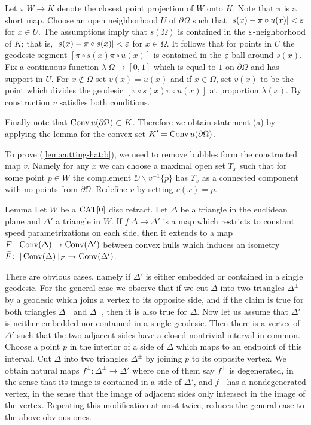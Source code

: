 \documentclass[a4paper,10pt]{amsart}
\begin{document}
Let $\pi\:W\to K$ denote the closest point projection of $W$ onto $K$. Note that $\pi$
is a short map. Choose an open neighborhood $U$ of $\partial \Omega$ such that 
$|s(x)-\pi\circ u(x)|<\varepsilon$ for $x\in U$. The assumptions imply that $s(\Omega)$ is 
contained in the $\varepsilon$-neighborhood of $K$;
that is, $|s(x)-\pi\circ s(x)|<\varepsilon$ for $x\in\Omega$.
It follows that for points in $U$ the geodesic segment $[\pi\circ s(x)\pi\circ u(x)]$ is contained in the $\varepsilon$-ball
around $s(x)$. Fix a continuous function $\lambda\:\Omega\to [0,1]$
which is equal to $1$ on $\partial \Omega$ and has support in $U$.
For $x\notin \Omega$ set $v(x)=u(x)$ and if 
$x\in \Omega$, set $v(x)$ to be the point which divides the geodesic $[\pi\circ s(x)\pi\circ u(x)]$
at proportion $\lambda(x)$. By construction $v$ satisfies both conditions.

Finally note that $\mathop{\rm Conv}\nolimits u(\partial\Omega)\subset K$. 
Therefore we obtain statement (a) 
by applying the lemma for the convex set $K'=\mathop{\rm Conv}\nolimits u(\partial\Omega)$.

To prove (\ref{lem:cutting-hat:b}), we need to remove bubbles form the constructed map $v$.
Namely for any $x$ we can choose a maximal open set $\Upsilon_x$ such that for some point $p\in W$ the complement $\DD\backslash v^{-1}\{p\}$ has $\Upsilon_x$ as a
connected component with no points from $\partial \DD$.
Redefine $v$ by setting $v(x)=p$.
\qeds

\begin{thm}{Lemma}\label{lem:isomtri}
Let $W$ be a $\mathop{\rm CAT}\nolimits[0]$ disc retract. 
Let $\Delta$ be a triangle in the euclidean plane
and $\Delta'$ a triangle in $W$. 
If $f\:\Delta\to \Delta'$ is a map which restricts to constant speed
parametrizations on each side, then it extends to a map 
$F\colon\mathop{\rm Conv}\nolimits(\Delta)\to \mathop{\rm Conv}\nolimits(\Delta')$ between convex hulls which induces an isometry $\bar F\colon\|\mathop{\rm Conv}\nolimits(\Delta)\|_F\to \mathop{\rm Conv}\nolimits(\Delta')$. 
\end{thm}

There are obvious cases, namely if $\Delta'$ is either embedded or contained in a single geodesic. 
For the general case we observe that if we cut $\Delta$ into two triangles $\Delta^\pm$ by a geodesic which joins a vertex to its opposite side, and if 
the claim is true for both triangles $\Delta^+$ and $\Delta^-$, then it is also true for $\Delta$. Now let us assume that $\Delta'$ is neither embedded nor contained
in a single geodesic. Then there is a vertex of $\Delta'$ such that the two adjacent sides have a closed nontrivial interval in common. Choose a point $p$ in the interior
of a side of $\Delta$ which maps to an endpoint of this interval. Cut $\Delta$ into two triangles $\Delta^\pm$ by joining $p$ to its opposite vertex.
We obtain natural maps $f^\pm:\Delta^\pm\to\Delta'$ where one of them say $f^+$ is degenerated, in the sense that its image is contained in a side of $\Delta'$, and $f^-$ has 
a nondegenerated vertex, in the sense that the image of adjacent sides only intersect in the image of the vertex. Repeating this modification at most twice,
reduces the general case to the above obvious ones.
\qeds
\end{document}
